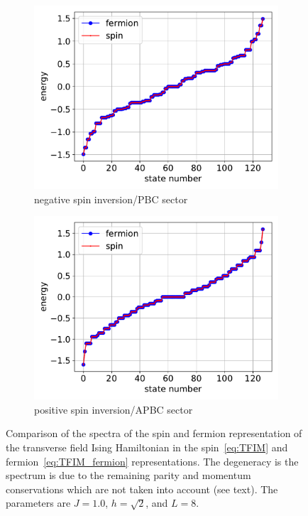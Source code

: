 \documentclass{SciPost}
\newcommand\0{\scalebox{-1}[1]{0}}
\begin{document}
\begin{figure}[t!]
	\centering
	\begin{subfigure}[a]{0.496\textwidth}
		\includegraphics[width=\textwidth]{JW_PBC.pdf}
		\caption{negative spin inversion/PBC sector}
	\end{subfigure}
	\begin{subfigure}[b]{0.496\textwidth}
		\includegraphics[width=\textwidth]{JW_APBC.pdf}
		\caption{positive spin inversion/APBC sector}
	\end{subfigure}
	\caption{\label{fig:JW} Comparison of the spectra of the spin and fermion representation of the transverse field Ising Hamiltonian in the spin~\eqref{eq:TFIM} and fermion~\eqref{eq:TFIM_fermion} representations. The degeneracy is the spectrum is due to the remaining parity and momentum conservations which are not taken into account (see text). The parameters are $J=1.0$, $h=\sqrt{2}$, and $L=8$.}  
\end{figure} 
\end{document}
